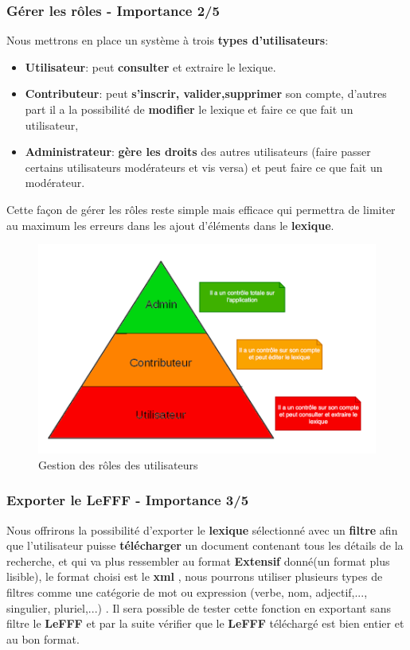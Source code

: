 \subsubsection{Gérer les rôles - Importance 2/5}
    
    Nous mettrons en place un système à trois \textbf{types d'utilisateurs}:
    \begin{itemize}
    \item \textbf{Utilisateur}:  peut \textbf{consulter} et extraire le lexique.
    \item \textbf{Contributeur}: peut \textbf{s'inscrir, valider,supprimer} son compte, d'autres part il a la possibilité de \textbf{modifier} le lexique et faire ce que fait un utilisateur,
    \item \textbf{Administrateur}: \textbf{gère les droits} des autres utilisateurs (faire passer certains utilisateurs modérateurs et vis versa) et peut faire ce que fait un modérateur.
    \end{itemize}
    {Cette façon de gérer les rôles reste simple mais efficace qui permettra de limiter au maximum les erreurs dans les ajout d'éléments dans le \textbf{lexique}.\par}
    
    \begin{figure}[ht]
        \centering
        \includegraphics[scale=0.3]{role.png}
        \caption{Gestion des rôles des utilisateurs }
    \end{figure}
    \newpage
    

 
\subsubsection{Exporter le LeFFF - Importance 3/5}
{Nous offrirons la possibilité d'exporter le \textbf{lexique} sélectionné avec un \textbf{filtre} afin que l'utilisateur puisse \textbf{télécharger} un document contenant tous les détails de la recherche, et qui va plus ressembler au format \textbf{Extensif} donné(un format plus lisible), le format choisi est le \textbf{xml} , nous pourrons utiliser plusieurs types de filtres comme une catégorie de mot ou expression (verbe, nom, adjectif,..., singulier, pluriel,...) . Il sera possible de tester cette fonction en exportant sans filtre le \textbf{LeFFF}  et par la suite vérifier que le \textbf{LeFFF} téléchargé est bien entier et au bon format.\par}



